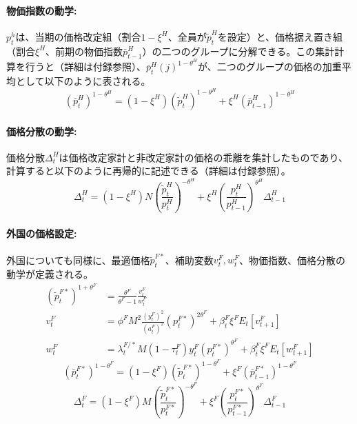 \paragraph*{物価指数の動学:}\label{sec:model_final_equations_pricing_ppi_h_dynamics}
\(p_t^h\)は、当期の価格改定組（割合\(1-\xi^H\)、全員が\(\widetilde{p}_t^H\)を設定）と、価格据え置き組（割合\(\xi^H\)、前期の物価指数\(\bar{p}_{t-1}^H\)）の二つのグループに分解できる。この集計計算を行うと（詳細は付録参照）、\(\bar{p}_t^H(j)^{1-\theta^H}\)が、二つのグループの価格の加重平均として以下のように表される。
\begin{equation}
(\bar{p}_t^H)^{1-\theta^H}=(1-\xi^H)(\widetilde{p}_t^H)^{1-\theta^H}+\xi^H(\bar{p}_{t-1}^H)^{1-\theta^H}
\label{form:model_final_equations_pricing_ppi_h}
\end{equation}

\paragraph*{価格分散の動学:}\label{sec:model_final_equations_pricing_delta_h_dynamics}
価格分散\(\Delta_t^H\)は価格改定家計と非改定家計の価格の乖離を集計したものであり、計算すると以下のように再帰的に記述できる（詳細は付録参照）。
\begin{equation}
\Delta_t^H=(1-\xi^H)N\left(\frac{\widetilde{p}_t^H}{p_t^H}\right)^{-\theta^H}+\xi^H\left(\frac{p_t^H}{p_{t-1}^H}\right)^{\theta^H}\Delta_{t-1}^H
\label{form:model_final_equations_pricing_delta_h}
\end{equation}

\paragraph*{外国の価格設定:}\label{sec:model_final_equations_pricing_foreign_dynamics}
外国についても同様に、最適価格\(\widetilde{p}_t^{F*}\)、補助変数\(v_t^F,w_t^F\)、物価指数、価格分散の動学が定義される。
\begin{align}
(\widetilde{p}_t^{F*})^{1+\theta^F}&=\frac{\theta^F}{\theta^F-1}\frac{v_t^F}{w_t^F} \label{form:model_final_equations_pricing_opt_p_f} \\
v_t^F&=\phi^FM^2\frac{(y_t^F)^2}{(a_t^F)^2}(p_t^{F*})^{2\theta^F}+\beta_t^F\xi^FE_t[v_{t+1}^F] \label{form:model_final_equations_pricing_v_f} \\
w_t^F&=\lambda_t^{F/*}M(1-\tau_t^F)y_t^F(p_t^{F*})^{\theta^F}+\beta_t^F\xi^FE_t[w_{t+1}^F] \label{form:model_final_equations_pricing_w_f}
\end{align}
\begin{equation}
(\bar{p}_t^{F*})^{1-\theta^F}=(1-\xi^F)(\widetilde{p}_t^{F*})^{1-\theta^F}+\xi^F(\bar{p}_{t-1}^{F*})^{1-\theta^F}
\label{form:model_final_equations_pricing_ppi_f}
\end{equation}
\begin{equation}
\Delta_t^F=(1-\xi^F)M\left(\frac{\widetilde{p}_t^{F*}}{p_t^{F*}}\right)^{-\theta^F}+\xi^F\left(\frac{p_t^{F*}}{p_{t-1}^{F*}}\right)^{\theta^F}\Delta_{t-1}^F
\label{form:model_final_equations_pricing_delta_f}
\end{equation}

